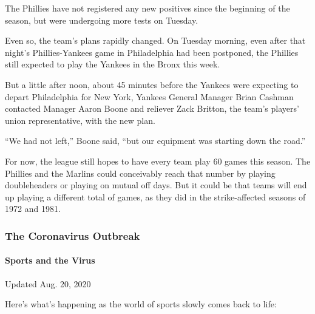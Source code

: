 The Phillies have not registered any new positives since the beginning
of the season, but were undergoing more tests on Tuesday.

Even so, the team's plans rapidly changed. On Tuesday morning, even
after that night's Phillies-Yankees game in Philadelphia had been
postponed, the Phillies still expected to play the Yankees in the Bronx
this week.

But a little after noon, about 45 minutes before the Yankees were
expecting to depart Philadelphia for New York, Yankees General Manager
Brian Cashman contacted Manager Aaron Boone and reliever Zack Britton,
the team's players' union representative, with the new plan.

``We had not left,'' Boone said, ``but our equipment was starting down
the road.''

For now, the league still hopes to have every team play 60 games this
season. The Phillies and the Marlins could conceivably reach that number
by playing doubleheaders or playing on mutual off days. But it could be
that teams will end up playing a different total of games, as they did
in the strike-affected seasons of 1972 and 1981.

\hypertarget{the-coronavirus-outbreak}{%
\subsubsection{The Coronavirus
Outbreak}\label{the-coronavirus-outbreak}}

\hypertarget{sports-and-the-virus}{%
\paragraph{Sports and the Virus}\label{sports-and-the-virus}}

Updated Aug. 20, 2020

Here's what's happening as the world of sports slowly comes back to
life:

